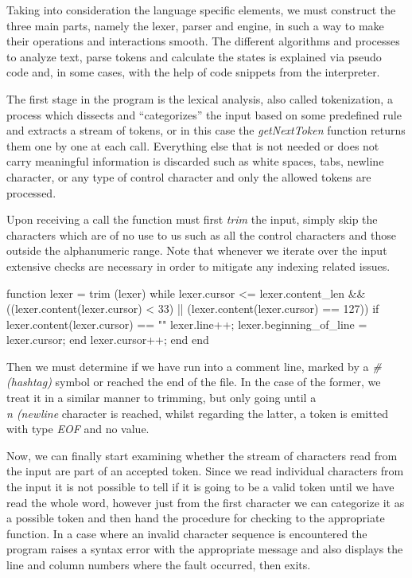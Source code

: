 Taking into consideration the language specific elements, we must construct the three main parts, namely the lexer, parser and engine, in such a way to make their operations and interactions smooth. The different algorithms and processes to analyze text, parse tokens and calculate the states is explained via pseudo code and, in some cases, with the help of code snippets from the interpreter.

The first stage in the program is the lexical analysis, also called tokenization, a process which dissects and ``categorizes'' the input based on some predefined rule and extracts a stream of tokens, or in this case the \textit{getNextToken} function returns them one by one at each call. Everything else that is not needed or does not carry meaningful information is discarded such as white spaces, tabs, newline character, or any type of control character and only the allowed tokens are processed.

Upon receiving a call the function must first \textit{trim} the input, simply skip the characters which are of no use to us such as all the control characters and those outside the alphanumeric range. Note that whenever we iterate over the input extensive checks are necessary in order to mitigate any indexing related issues.

\begin{octave}
function lexer = trim (lexer)
  while lexer.cursor <= lexer.content_len &&
  ((lexer.content(lexer.cursor) < 33) ||
  (lexer.content(lexer.cursor) == 127))
    if lexer.content(lexer.cursor) == "\n"
      lexer.line++;
      lexer.beginning_of_line = lexer.cursor;
    end
    lexer.cursor++;
  end
end
\end{octave}

Then we must determine if we have run into a comment line, marked by a \textit{\# (hashtag)} symbol or reached the end of the file. In the case of the former, we treat it in a similar manner to trimming, but only going until a \textit{\\n (newline} character is reached, whilst regarding the latter, a token is emitted with type \textit{EOF} and no value.

Now, we can finally start examining whether the stream of characters read from the input are part of an accepted token. Since we read individual characters from the input it is not possible to tell if it is going to be a valid token until we have read the whole word, however just from the first character we can categorize it as a possible token and then hand the procedure for checking to the appropriate function. In a case where an invalid character sequence is encountered the program raises a syntax error with the appropriate message and also displays the line and column numbers where the fault occurred, then exits.


